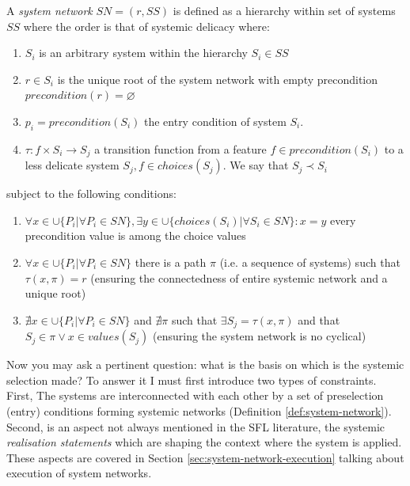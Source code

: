\begin{definition}\label{def:system-network}
	A \textit{system network} $SN=(r,SS)$ is defined as a hierarchy within set of systems $SS$ where the order is that of systemic delicacy where:
	\begin{enumerate}
		\item $S_{i}$ is an arbitrary system within the hierarchy $S_{i} \in SS $
		\item $r \in S_{i}$ is the unique root of the system network with empty precondition $precondition(r)=\varnothing $
		\item $p_{i} = precondition(S_{i})$ the entry condition of system $S_{i}$.
		\item $\tau: f \times S_{i} \rightarrow S_{j}$ a transition function from a feature $f \in precondition(S_{i})$ to a less delicate system $S_{j}, f \in choices(S_{j})$. We say that $S_{j} \prec S_{i}$
	\end{enumerate}
	subject to the following conditions:
	\begin{enumerate}
		\item $\forall x \in \cup \{ P_{i}| \forall P_{i} \in SN \}, \exists y \in \cup \{ choices(S_{i})| \forall S_{i} \in SN \}: x=y$ every precondition value is among the choice values
		\item $\forall x \in \cup \{ P_{i}| \forall P_{i} \in SN \}$ there is a path $\pi$ (i.e. a sequence of systems) such that $\tau(x,\pi)=r$ (ensuring the connectedness of entire systemic network and a unique root)
		\item $\nexists x \in \cup \{ P_{i}| \forall P_{i} \in SN \}$ and $\nexists \pi$ such that $\exists S_{j}=\tau(x,\pi)$ and that $ S_{j} \in \pi \vee x \in values(S_{j}) $ (ensuring the system network is no cyclical)
	\end{enumerate}
\end{definition}

Now you may ask a pertinent question: what is the basis on which is the systemic selection made? To answer it I must first introduce two types of constraints. 
First, The systems are interconnected with each other by a set of preselection (entry) conditions forming systemic networks (Definition \ref{def:system-network}). Second, is an aspect not always mentioned in the SFL literature, the systemic \textit{realisation statements} which are shaping the context where the system is applied. These aspects are covered in Section \ref{sec:system-network-execution} talking about execution of system networks.  


